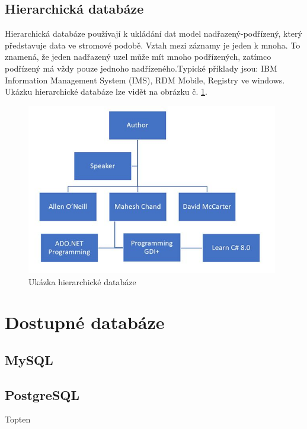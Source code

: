 \subsection{Hierarchická databáze}
Hierarchická databáze používají k ukládání dat model nadřazený-podřízený, který představuje data ve stromové podobě. Vztah mezi záznamy je jeden k mnoha. To znamená, že jeden nadřazený uzel může mít mnoho podřízených, zatímco podřízený má vždy pouze jednoho nadřízeného.Typické příklady jsou: IBM Information Management System (IMS), RDM Mobile, Registry ve windows. Ukázku hierarchické databáze lze vidět na obrázku č. \ref{fig:db_img_hierarchical}.
	\begin{figure}[H]
	\centering
	\includegraphics[width=11cm]{img/databaze/hierarchical_db}
	\caption{Ukázka hierarchické databáze}
	\label{fig:db_img_hierarchical}
	\end{figure}

\section{Dostupné databáze}
\subsection{MySQL}
\subsection{PostgreSQL}
\cite{TopTenDatabases}Topten\newline
\cite{indeedDBLanguage}\newline

